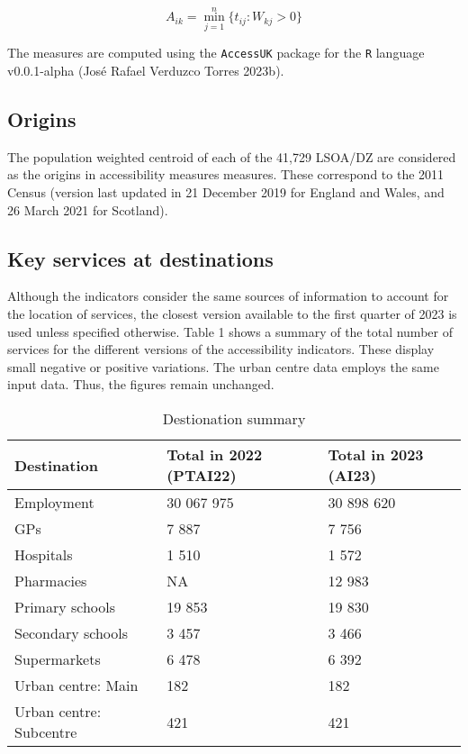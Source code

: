 \documentclass{article}
\begin{document}
\[
A_{ik} = \min_{j=1}^{n} \{ t_{ij} : W_{kj} > 0 \}
\]

The measures are computed using the \texttt{AccessUK} package for the
\texttt{R} language v0.0.1-alpha (José Rafael Verduzco Torres 2023b).

\hypertarget{origins}{%
\subsection{Origins}\label{origins}}

The population weighted centroid of each of the 41,729 LSOA/DZ are
considered as the origins in accessibility measures measures. These
correspond to the 2011 Census (version last updated in 21 December 2019
for England and Wales, and 26 March 2021 for Scotland).

\hypertarget{key-services-at-destinations}{%
\subsection{Key services at
destinations}\label{key-services-at-destinations}}

Although the indicators consider the same sources of information to
account for the location of services, the closest version available to
the first quarter of 2023 is used unless specified otherwise. Table 1
shows a summary of the total number of services for the different
versions of the accessibility indicators. These display small negative
or positive variations. The urban centre data employs the same input
data. Thus, the figures remain unchanged.

\begin{table}[!h]

\caption{\label{tab:unnamed-chunk-2}Destionation summary}
\centering
\begin{tabu} to 
\toprule
Destination & Total in 2022
(PTAI22) & Total in 2023
(AI23)\\
\midrule
Employment & 30 067 975 & 30 898 620\\
GPs & 7 887 & 7 756\\
Hospitals & 1 510 & 1 572\\
Pharmacies & NA & 12 983\\
Primary schools & 19 853 & 19 830\\
\addlinespace
Secondary schools & 3 457 & 3 466\\
Supermarkets & 6 478 & 6 392\\
Urban centre: Main & 182 & 182\\
Urban centre: Subcentre & 421 & 421\\
\bottomrule
\end{tabu}
\end{table}
\end{document}
